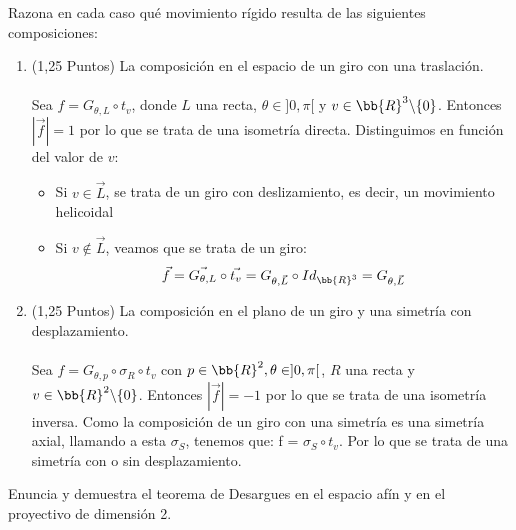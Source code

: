 \documentclass[12pt]{article}
\begin{document}
    \begin{ejercicio}[2,5 puntos]
        Razona en cada caso qué movimiento rígido resulta de las siguientes composiciones:

        \begin{enumerate}
            \item (1,25 Puntos) La composición en el espacio de un giro con una traslación.
                \\ \\
                Sea $f = G_{\theta, L} \circ t_v$, donde $L$ una recta, $\theta \in ]0, \pi[$ y $v \in \bb{R}^3 \backslash \{0\}$. Entonces $|\vec{f}| = 1$ por lo que se trata de una isometría directa. Distinguimos en función del valor de $v$:
                \begin{itemize}
                    \item Si $v \in \vec{L}$, se trata de un giro con deslizamiento, es decir, un movimiento helicoidal
                    \item Si $v \notin \vec{L}$, veamos que se trata de un giro:
                        \begin{equation*}
                            \vec{f} = \vec{G_{\theta, L}} \circ \vec{t_v} = G_{\theta, \vec{L}} \circ Id_{\bb{R}^3} = G_{\theta, \vec{L}}
                        \end{equation*}
                \end{itemize}
            \item (1,25 Puntos) La composición en el plano de un giro y una simetría con desplazamiento.
                \\ \\
                Sea $f = G_{\theta, p} \circ \sigma_R \circ t_v$ con $p \in \bb{R}^2, \theta \in ]0, \pi[$, $R$ una recta y $v \in \bb{R}^2 \backslash \{0\}$. Entonces $|\vec{f}| = -1$ por lo que se trata de una isometría inversa. Como la composición de un giro con una simetría es una simetría axial, llamando a esta $\sigma_S$, tenemos que:
                f = $\sigma_S \circ t_v$. Por lo que se trata de una simetría con o sin desplazamiento.
        \end{enumerate}

    \end{ejercicio}

    \begin{ejercicio}[2,5 puntos]
        Enuncia y demuestra el teorema de Desargues en el espacio afín y en el proyectivo de dimensión 2.
    \end{ejercicio}
\end{document}
